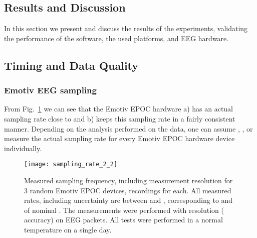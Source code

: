 \documentclass[10pt]{article}
\begin{document}
\begin{center}
\iffalse{
To illustrate the potential for performing such study in a completely mobile context all stimulus delivery and data recording were carried out using the SBS2 framework, while post-processing and decoding were conducted off-line using standard analysis tools. In particular, we applied a common spatial pattern (CSP) approach \cite{Muller-Gerking1999:DesigningOptimalSpatialFilters} to extract spatial filters that maximize the variance for one class while minimizing the variance of the other class and vice versa. A quadratic Bayesian classifier for decoding was applied on features transformed as in \cite{Muller-Gerking1999:DesigningOptimalSpatialFilters}.
}\fi

















 \section{Results and Discussion}
In this section we present and discuss the results of the experiments, validating the performance of the software, the used platforms, and EEG hardware.
\subsection{Timing and Data Quality}
\subsubsection{Emotiv EEG sampling}
From Fig.~\ref{figure_sampling} we can see that the Emotiv EPOC hardware a) has an actual sampling rate close to  and b) keeps this sampling rate in a fairly consistent manner.  Depending on the analysis performed on the data, one can assume , , or measure the actual sampling rate for every Emotiv EPOC hardware device individually.
\begin{figure}[!t]
\centering
\texttt{[image: sampling\_rate\_2\_2]}
\caption{Measured sampling frequency, including measurement resolution for 3 random Emotiv EPOC devices,  recordings for each.  All measured rates, including uncertainty are between  and , corresponding to  and  of nominal . The measurements were performed with  resolution ( accuracy) on  EEG packets. All tests were performed in a normal temperature on a single day.}
\label{figure_sampling}
\end{figure}

\end{center}
\end{document}
